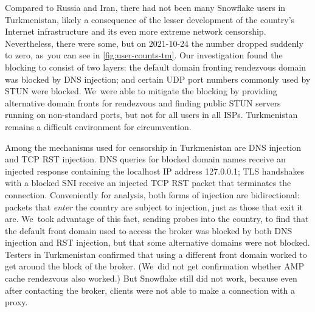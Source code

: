 \documentclass[letterpaper,twocolumn]{article}
\begin{document}

Compared to Russia and Iran,
there had not been many Snowflake users in Turkmenistan,
likely a consequence of the lesser development
of the country's Internet infrastructure
and its even more extreme network censorship.
Nevertheless, there were some,
but on \mbox{2021-10-24} the number dropped suddenly to zero,
as~you can see in \autoref{fig:user-counts-tm}.
Our investigation found the blocking to consist of two layers:
the default domain fronting rendezvous domain was blocked
by DNS injection;
and certain UDP port numbers commonly used by STUN were blocked.
We~were able to mitigate the blocking
by providing alternative domain fronts for rendezvous
and finding public STUN servers running on non-standard ports,
but not for all users in all ISPs.
Turkmenistan remains a difficult environment for circumvention.

Among the mechanisms used for censorship in Turkmenistan
are DNS injection and TCP RST injection.
DNS queries for blocked domain names receive an injected response
containing the localhost IP address 127.0.0.1;
TLS handshakes with a blocked SNI receive an injected TCP RST packet
that terminates the connection.
Conveniently for analysis,
both forms of injection are bidirectional:
packets that \emph{enter} the country are subject to injection,
just as those that exit it are.
We~took advantage of this fact,
sending probes into the country,
to find that the default front domain used to access the broker
was blocked by both DNS injection and RST injection,
but that some alternative domains were not blocked.
Testers in Turkmenistan confirmed that using a different front domain
worked to get around the block of the broker.
(We~did not get confirmation whether AMP cache rendezvous also worked.)
But Snowflake still did not work,
because even after contacting the broker,
clients were not able to make a connection with a proxy.
\end{document}
